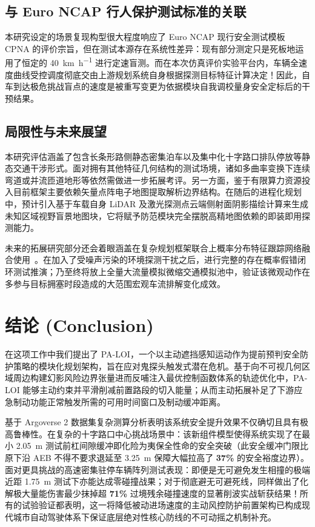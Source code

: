 \documentclass[conference]{IEEEtran}
\begin{document}
\subsection{与 Euro NCAP 行人保护测试标准的关联}
本研究设定的场景复现构型很大程度响应了 Euro NCAP 现行安全测试模板 CPNA 的评价宗旨，但在测试本源存在系统性差异：现有部分测定只是死板地运用了恒定的 \SI{40}{\kilo\meter\per\hour} 进行定速盲测。而在本次仿真评价实验平台内，车辆全速度曲线受控调度彻底交由上游规划系统自身根据探测目标特征计算决定！因此，自车到达极危挑战盲点的速度是被重写变更为依据模块自我调校量身安全定标后的干预结果。

\subsection{局限性与未来展望}
本研究评估涵盖了包含长条形路侧静态密集泊车以及集中化十字路口排队停放等静态交通干涉形式。面对拥有其他特征几何结构的测试场境，诸如多曲率变换下连续弯道或并流匝道地形等依然需做进一步拓展考评。另一方面，鉴于有限算力资源投入目前框架主要依赖矢量点阵电子地图提取解析边界结构。在随后的进程化规划中，预计引入基于车载自身 LiDAR 及激光探测点云端侧射面阴影描绘计算来生成未知区域视野盲景地图块，它将赋予防范模块完全摆脱高精地图依赖的即装即用探测能力。

未来的拓展研究部分还会着眼涵盖在复杂规划框架联合上概率分布特征跟踪网络融合使用~\cite{occtrack2025}。在加入了受噪声污染的环境探测干扰之后，进行完整的存在概率假错闭环测试推演；乃至终将放上全量大流量模拟微缩交通模拟池中，验证该微观动作在多参与目标拥塞时段造成的大范围宏观车流排解变化成效。

\section{结论 (Conclusion)}

在这项工作中我们提出了 PA-LOI，一个以主动遮挡感知运动作为提前预判安全防护策略的模块化规划架构，旨在应对鬼探头触发式潜在危机。基于向不可视几何区域周边构建幻影风险边界张量进而反哺注入最优控制函数体系的轨迹优化中，PA-LOI 能够主动约束并平滑削减前置路段的切入能量；从而主动拓展补足了下游应急制动功能正常触发所需的可用时间窗口及制动缓冲距离。

基于 Argoverse 2 数据集复杂测算分析表明该系统安全提升效果不仅确切且具有极高鲁棒性。在复杂的十字路口中心挑战场景中：该新组件模型使得系统实现了在最小 \SI{2.05}{\meter} 测试前杠间隙缓冲即化险为夷保全性命的安全突破（此安全缓冲门限比原下沿 AEB 不得不要求退延至 \SI{3.25}{\meter} 保障大幅拉高了 \textbf{37\%} 的安全裕度边界）。面对更具挑战的高速密集驻停车辆阵列测试表现：即便是无可避免发生相撞的极端近距 \SI{1.75}{\meter} 测试下亦能达成零碰撞战果；对于彻底避无可避死线，同样做出了化解极大量能伤害最少抹掉超 \textbf{71\%} 过境残余碰撞速度的显著削波实战斩获结果！所有的试验验证都表明，这一将降低被动进场速度的主动风控防护前置架构已构成现代城市自动驾驶体系下保证底层绝对性核心防线的不可动摇之机制补充。


\end{document}
